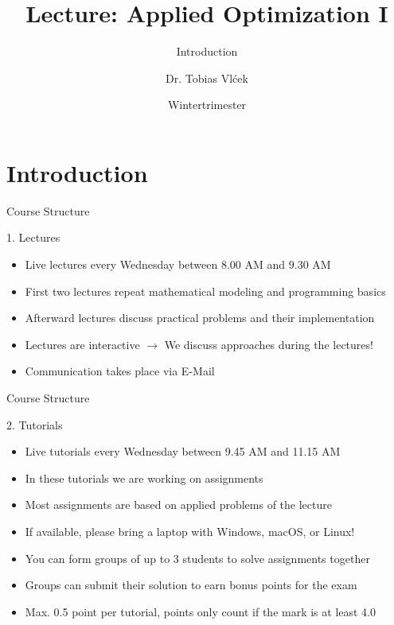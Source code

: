 \documentclass[aspectratio=1610,12pt]{beamer}
\title{Lecture: Applied Optimization I}
\subtitle{Introduction}
\author{Dr. Tobias Vlćek}
\institute[UHH, IVLP]{UHH, Institute of Logistics, Transport and Production @Helmut Schmidt University}
\date{Wintertrimester \the\year}
\begin{document}
\maketitle
{}

\section{Introduction}

\begin{frame}[fragile]{Course Structure}
    \begin{block}{1. Lectures}
		\begin{itemize}
			\item Live lectures every Wednesday between 8.00 AM and 9.30 AM
			\item First two lectures repeat mathematical modeling and programming basics
			\item Afterward lectures discuss practical problems and their implementation
			\item Lectures are interactive $\rightarrow$ We discuss approaches during the lectures!
			\item Communication takes place via E-Mail
		\end{itemize}
    \end{block}
\end{frame}

\begin{frame}[fragile]{Course Structure}
    \begin{block}{2. Tutorials}
		\begin{itemize}
    		\item Live tutorials every Wednesday between 9.45 AM and 11.15 AM
    		\item In these tutorials we are working on assignments
    		\item Most assignments are based on applied problems of the lecture
			\item If available, please bring a laptop with Windows, macOS, or Linux!
			\item You can form groups of up to 3 students to solve assignments together
			\item Groups can submit their solution to earn bonus points for the exam
			\item Max. 0.5 point per tutorial, points only count if the mark is at least 4.0
        \end{itemize}
    \end{block}
\end{frame}
\end{document}
